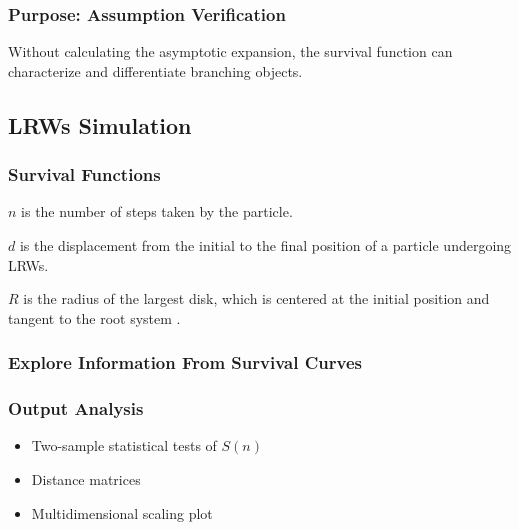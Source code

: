            

    \subsubsection{Purpose: Assumption Verification}
      \par
       Without calculating the asymptotic expansion, the survival function can characterize and differentiate branching objects.
    


  \subsection{LRWs Simulation}

     \subsubsection{Survival Functions}

            \par
            $n$ is the number of steps taken by the particle.
            \par
            $d$ is the displacement from the initial to the final position of a particle undergoing LRWs.
            \par
            $R$ is the radius of the largest disk, which is centered at the initial position and tangent to the root system \cite{baddeley1994empty}.

     \subsubsection{Explore Information From Survival Curves}
            
     \subsubsection{Output Analysis}
        \begin{itemize}
          \item Two-sample statistical tests of $S(n)$
          \item Distance matrices
          \item Multidimensional scaling plot  
        \end{itemize}
        

